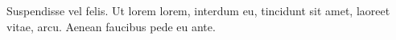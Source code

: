 Suspendisse vel
felis. Ut lorem
lorem, interdum
eu, tincidunt sit
amet, laoreet vitae,
arcu. Aenean
faucibus pede eu
ante.